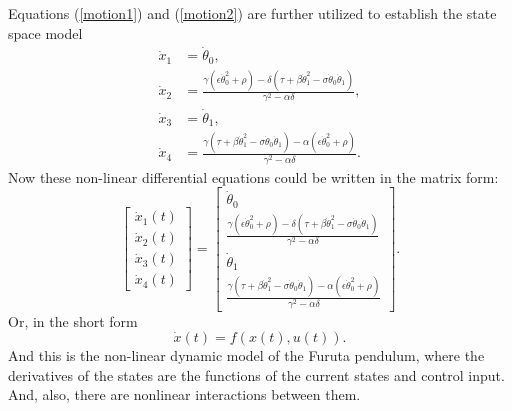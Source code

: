 Equations (\ref{motion1}) and (\ref{motion2}) are further utilized to establish the state
space model
\begin{subequations}
	\begin{align}
	\dot{x}_1 &= \dot{\theta}_0, \\
	\dot{x}_2 &= \frac{\gamma(\epsilon\dot{\theta}_0^2+\rho)-\delta(\tau+\beta\dot{\theta}_1^2-\sigma\dot{\theta}_0\dot{\theta}_1)}{\gamma^2-\alpha\delta},\\
	\dot{x}_3 &= \dot{\theta}_1,\\
	\dot{x}_4 &= \frac{\gamma(\tau+\beta\dot{\theta}_1^2-\sigma\dot{\theta}_0\dot{\theta}_1)-\alpha(\epsilon\dot{\theta}_0^2+\rho)}{\gamma^2-\alpha\delta}.
	\end{align}
\end{subequations}
Now these non-linear differential equations could be written in the matrix form:
\begin{equation}\label{nonlinmodel}
\begin{bmatrix}
\dot{x}_1(t) \\ \dot{x}_2(t) \\ \dot{x}_3(t) \\ \dot{x}_4(t)
\end{bmatrix} = \begin{bmatrix}
\dot{\theta}_0\\
\frac{\gamma(\epsilon\dot{\theta}_0^2+\rho)-\delta(\tau+\beta\dot{\theta}_1^2-\sigma\dot{\theta}_0\dot{\theta}_1)}{\gamma^2-\alpha\delta}\\
\dot{\theta}_1\\
\frac{\gamma(\tau+\beta\dot{\theta}_1^2-\sigma\dot{\theta}_0\dot{\theta}_1)-\alpha(\epsilon\dot{\theta}_0^2+\rho)}{\gamma^2-\alpha\delta}
\end{bmatrix}.
\end{equation}
Or, in the short form
\begin{equation} \dot{x}(t) = f(x(t),u(t)). \end{equation}
And this is the non-linear dynamic model of the Furuta pendulum, where the derivatives of the states are the functions of the current states and control input. And, also, there are nonlinear interactions between them. 
